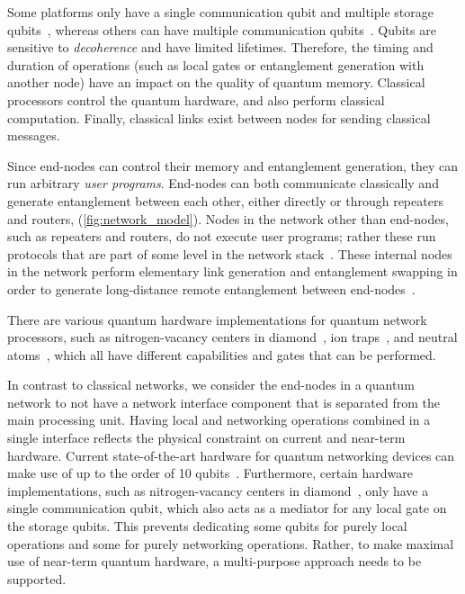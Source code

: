 Some platforms only have a single communication qubit and multiple storage qubits~\cite{Bernien2014}, whereas others can have multiple communication qubits~\cite{Inlek2017}.
Qubits are sensitive to \textit{decoherence} and have limited lifetimes.
Therefore, the timing and duration of operations (such as local gates or entanglement generation with another node) have an impact on the quality of quantum memory. Classical processors control the quantum hardware, and also perform classical computation.
Finally, classical links exist between nodes for sending classical messages.

Since end-nodes can control their memory and entanglement generation, they can run arbitrary \textit{user programs}.
End-nodes can both communicate classically and generate entanglement between each other, either directly or through repeaters and routers, (\cref{fig:network_model}). Nodes in the network other than end-nodes, such as repeaters and routers, do not execute user programs; rather these run protocols that are part of some level in the
network stack~\cite{dahlberg2019linklayer,kozlowski2020networklayer}.
These internal nodes in the network perform elementary link generation and entanglement swapping in order to generate long-distance remote entanglement between end-nodes~\cite{dahlberg2019linklayer}.

There are various quantum hardware implementations for quantum network processors, such as nitrogen-vacancy centers in diamond~\cite{Bernien2014}, ion traps~\cite{moehring2007entanglement}, and neutral atoms~\cite{hofmann2012heralded,ritter2012elementary}, which all have different capabilities and gates that can be performed.

In contrast to classical networks, we consider the end-nodes in a quantum network to not have a network interface component that is separated from the main processing unit.
Having local and networking operations combined in a single interface reflects the physical constraint on current and near-term hardware.
Current state-of-the-art hardware for quantum networking devices can make use of up to the order of 10 qubits~\cite{bradley2019solidstate}.
Furthermore, certain hardware implementations, such as nitrogen-vacancy centers in diamond~\cite{Bernien2014}, only have a single communication qubit, which also acts as a mediator for any local gate on the storage qubits.
This prevents dedicating some qubits for purely local operations and some for purely networking operations.
Rather, to make maximal use of near-term quantum hardware, a multi-purpose approach needs to be supported.

